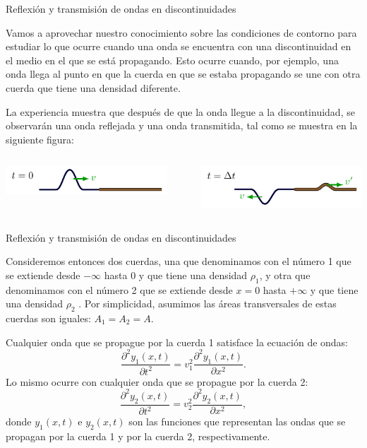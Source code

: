 \documentclass[11pt,handout,aspectratio=1610]{beamer}
\newcommand{\pddiff}[2]{\frac{\partial^2 #1}{\partial #2^2}}
\newcommand{\vs}{\vspace{11pt}}
\begin{document}
\begin{frame}{Reflexión y transmisión de ondas en discontinuidades}

    Vamos a aprovechar nuestro conocimiento sobre las condiciones de contorno para estudiar lo que ocurre cuando una onda se encuentra con una discontinuidad en el medio en el que se está propagando. Esto ocurre cuando, por ejemplo, una onda llega al punto en que la cuerda en que se estaba propagando se une con otra cuerda que tiene una densidad diferente.

    \vs 

    La experiencia muestra que después de que la onda llegue a la discontinuidad, se observarán una onda reflejada y una onda transmitida, tal como se muestra en la siguiente figura:
    \begin{columns}
        \begin{column}{0.45\textwidth}
            \includegraphics[width=\textwidth]{../figs/waves_reflection_transmission-5.pdf}
        \end{column}
        ~
        \begin{column}{0.45\textwidth}
            \includegraphics[width=\textwidth]{../figs/waves_reflection_transmission-6.pdf}
        \end{column}
    \end{columns}

\end{frame}

\begin{frame}{Reflexión y transmisión de ondas en discontinuidades}

    Consideremos entonces dos cuerdas, una que denominamos con el número 1 que se extiende desde $-\infty$ hasta $0$ y que tiene una densidad $\rho_1$, y otra que denominamos con el número 2 que se extiende desde $x=0$ hasta $+\infty$ y que tiene una densidad $\rho_2$ . Por simplicidad, asumimos las áreas transversales de estas cuerdas son iguales: $A_1 = A_2 = A$.

    \vs

    Cualquier onda que se propague por la cuerda 1 satisface la ecuación de ondas: $$ \pddiff{y_1 \left(x,t\right)}{t} = v_1^2 \pddiff{y_1 \left(x,t\right)}{x}. $$ Lo mismo ocurre con cualquier onda que se propague por la cuerda 2: $$ \pddiff{y_2 \left(x,t\right)}{t} = v_2^2 \pddiff{y_2 \left(x,t\right)}{x}, $$ donde $y_1 \left(x,t\right)$ e $y_2 \left(x,t\right)$ son las funciones que representan las ondas que se propagan por la cuerda 1 y por la cuerda 2, respectivamente.

\end{frame}
\end{document}

